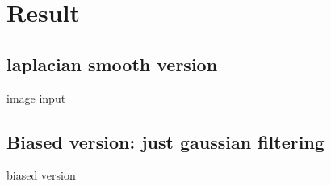 \section*{Result}\label{ch:ch4label}
\subsection*{laplacian smooth version}

image input 


\subsection*{Biased version: just gaussian filtering}

biased version